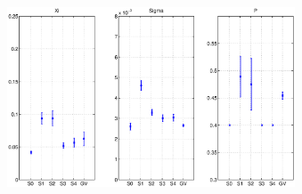 \documentclass[9pt,handout,serif]{beamer}
\begin{document}
\begin{frame}
\begin{columns}
\begin{figure}
		\end{figure}
		\begin{figure}
			\centering
			\includegraphics[width=1\textwidth]{../images/results/localview/session_experiment/20sessions}
		\end{figure}
	\end{columns}
\end{frame}
\end{document}
